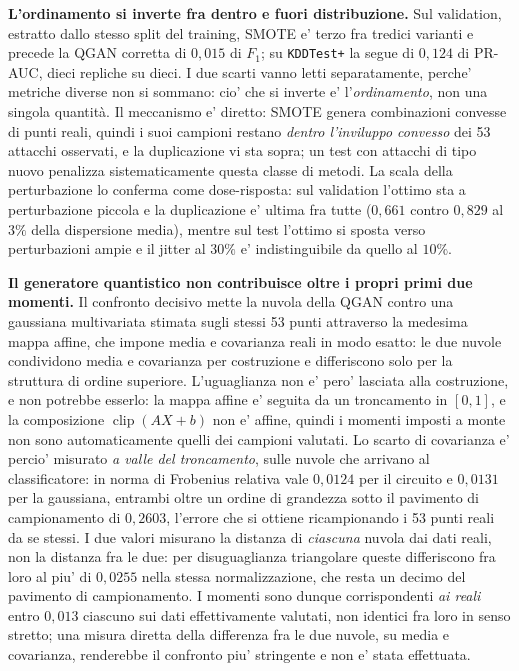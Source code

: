 \documentclass[10pt,conference,a4paper,twocolumn]{IEEEtran}
\begin{document}
\textbf{L'ordinamento si inverte fra dentro e fuori distribuzione.} Sul validation, estratto dallo stesso split del training, SMOTE e' terzo fra tredici varianti e precede la QGAN corretta di $0{,}015$ di $F_1$; su \texttt{KDDTest+} la segue di $0{,}124$ di PR-AUC, dieci repliche su dieci. I due scarti vanno letti separatamente, perche' metriche diverse non si sommano: cio' che si inverte e' l'\emph{ordinamento}, non una singola quantità. Il meccanismo e' diretto: SMOTE genera combinazioni convesse di punti reali, quindi i suoi campioni restano \emph{dentro l'inviluppo convesso} dei 53 attacchi osservati, e la duplicazione vi sta sopra; un test con attacchi di tipo nuovo penalizza sistematicamente questa classe di metodi. La scala della perturbazione lo conferma come dose-risposta: sul validation l'ottimo sta a perturbazione piccola e la duplicazione e' ultima fra tutte ($0{,}661$ contro $0{,}829$ al $3\%$ della dispersione media), mentre sul test l'ottimo si sposta verso perturbazioni ampie e il jitter al $30\%$ e' indistinguibile da quello al $10\%$.

\textbf{Il generatore quantistico non contribuisce oltre i propri primi due momenti.} Il confronto decisivo mette la nuvola della QGAN contro una gaussiana multivariata stimata sugli stessi 53 punti attraverso la medesima mappa affine, che impone media e covarianza reali in modo esatto: le due nuvole condividono media e covarianza per costruzione e differiscono solo per la struttura di ordine superiore. L'uguaglianza non e' pero' lasciata alla costruzione, e non potrebbe esserlo: la mappa affine e' seguita da un troncamento in $[0,1]$, e la composizione $\operatorname{clip}(AX+b)$ non e' affine, quindi i momenti imposti a monte non sono automaticamente quelli dei campioni valutati. Lo scarto di covarianza e' percio' misurato \emph{a valle del troncamento}, sulle nuvole che arrivano al classificatore: in norma di Frobenius relativa vale $0{,}0124$ per il circuito e $0{,}0131$ per la gaussiana, entrambi oltre un ordine di grandezza sotto il pavimento di campionamento di $0{,}2603$, l'errore che si ottiene ricampionando i 53 punti reali da se stessi. I due valori misurano la distanza di \emph{ciascuna} nuvola dai dati reali, non la distanza fra le due: per disuguaglianza triangolare queste differiscono fra loro al piu' di $0{,}0255$ nella stessa normalizzazione, che resta un decimo del pavimento di campionamento. I momenti sono dunque corrispondenti \emph{ai reali} entro $0{,}013$ ciascuno sui dati effettivamente valutati, non identici fra loro in senso stretto; una misura diretta della differenza fra le due nuvole, su media e covarianza, renderebbe il confronto piu' stringente e non e' stata effettuata.
\end{document}
